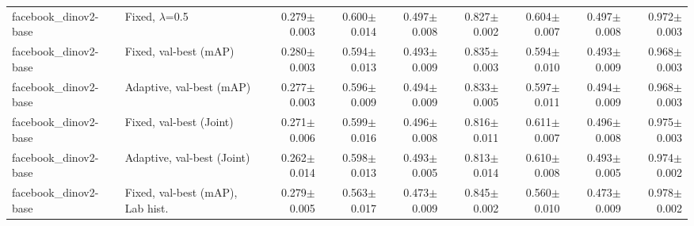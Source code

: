 \begin{table}[t]
{\begin{tabular}{llrrrrrrr}
facebook\_dinov2-base & Fixed, $\lambda$=0.5 & 0.279$\pm$0.003 & 0.600$\pm$0.014 & 0.497$\pm$0.008 & 0.827$\pm$0.002 & 0.604$\pm$0.007 & 0.497$\pm$0.008 & 0.972$\pm$0.003 \\
facebook\_dinov2-base & Fixed, val-best (mAP) & 0.280$\pm$0.003 & 0.594$\pm$0.013 & 0.493$\pm$0.009 & 0.835$\pm$0.003 & 0.594$\pm$0.010 & 0.493$\pm$0.009 & 0.968$\pm$0.003 \\
facebook\_dinov2-base & Adaptive, val-best (mAP) & 0.277$\pm$0.003 & 0.596$\pm$0.009 & 0.494$\pm$0.009 & 0.833$\pm$0.005 & 0.597$\pm$0.011 & 0.494$\pm$0.009 & 0.968$\pm$0.003 \\
facebook\_dinov2-base & Fixed, val-best (Joint) & 0.271$\pm$0.006 & 0.599$\pm$0.016 & 0.496$\pm$0.008 & 0.816$\pm$0.011 & 0.611$\pm$0.007 & 0.496$\pm$0.008 & 0.975$\pm$0.003 \\
facebook\_dinov2-base & Adaptive, val-best (Joint) & 0.262$\pm$0.014 & 0.598$\pm$0.013 & 0.493$\pm$0.005 & 0.813$\pm$0.014 & 0.610$\pm$0.008 & 0.493$\pm$0.005 & 0.974$\pm$0.002 \\
facebook\_dinov2-base & Fixed, val-best (mAP), Lab hist. & 0.279$\pm$0.005 & 0.563$\pm$0.017 & 0.473$\pm$0.009 & 0.845$\pm$0.002 & 0.560$\pm$0.010 & 0.473$\pm$0.009 & 0.978$\pm$0.002 \\
\bottomrule\end{tabular}}
\end{table}